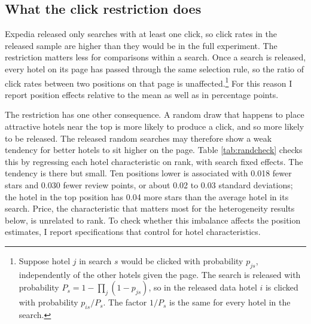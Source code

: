 \documentclass[12pt]{article}
\begin{document}
\subsection{What the click restriction does}\label{sec:clicks}

Expedia released only searches with at least one click, so click rates in the released sample are higher than they would be in the full experiment. The restriction matters less for comparisons within a search. Once a search is released, every hotel on its page has passed through the same selection rule, so the ratio of click rates between two positions on that page is unaffected.\footnote{Suppose hotel $j$ in search $s$ would be clicked with probability $p_{js}$, independently of the other hotels given the page. The search is released with probability $P_s = 1 - \prod_j (1 - p_{js})$, so in the released data hotel $i$ is clicked with probability $p_{is}/P_s$. The factor $1/P_s$ is the same for every hotel in the search.} For this reason I report position effects relative to the mean as well as in percentage points.

The restriction has one other consequence. A random draw that happens to place attractive hotels near the top is more likely to produce a click, and so more likely to be released. The released random searches may therefore show a weak tendency for better hotels to sit higher on the page. Table \ref{tab:randcheck} checks this by regressing each hotel characteristic on rank, with search fixed effects. The tendency is there but small. Ten positions lower is associated with 0.018 fewer stars and 0.030 fewer review points, or about 0.02 to 0.03 standard deviations; the hotel in the top position has 0.04 more stars than the average hotel in its search. Price, the characteristic that matters most for the heterogeneity results below, is unrelated to rank. To check whether this imbalance affects the position estimates, I report specifications that control for hotel characteristics.
\end{document}
